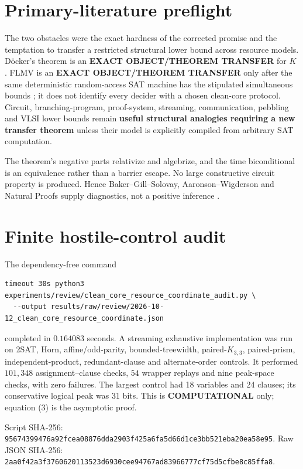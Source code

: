 \documentclass[11pt]{article}
\newcommand{\COMP}{\textbf{COMPUTATIONAL}}
\begin{document}
\section{Primary-literature preflight}

The two obstacles were the exact hardness of the corrected promise and the
temptation to transfer a restricted structural lower bound across resource
models.  D\"ocker's theorem is an \textbf{EXACT OBJECT/THEOREM TRANSFER} for
$K$ \cite{Docker19}.  FLMV is an \textbf{EXACT OBJECT/THEOREM TRANSFER} only
after the same deterministic random-access SAT machine has the stipulated
simultaneous bounds \cite{FLMV05}; it does not identify every decider with a
chosen clean-core protocol.  Circuit, branching-program, proof-system,
streaming, communication, pebbling and VLSI lower bounds remain
\textbf{useful structural analogies requiring a new transfer theorem} unless
their model is explicitly compiled from arbitrary SAT computation.

The theorem's negative parts relativize and algebrize, and the time
biconditional is an equivalence rather than a barrier escape.  No large
constructive circuit property is produced.  Hence Baker--Gill--Solovay,
Aaronson--Wigderson and Natural Proofs supply diagnostics, not a positive
inference \cite{BGS75,AW09,RR97}.

\section{Finite hostile-control audit}

The dependency-free command
\begin{verbatim}
timeout 30s python3 experiments/review/clean_core_resource_coordinate_audit.py \
  --output results/raw/review/2026-10-12_clean_core_resource_coordinate.json
\end{verbatim}
completed in $0.164083$ seconds.  A streaming exhaustive implementation was
run on 2SAT, Horn, affine/odd-parity, bounded-treewidth, paired-$K_{3,3}$,
paired-prism, independent-product, redundant-clause and alternate-order
controls.  It performed $101{,}348$ assignment--clause checks, $54$ wrapper
replays and nine peak-space checks, with zero failures.  The largest control
had 18 variables and 24 clauses; its conservative logical peak was 31 bits.
This is \COMP{} only; equation (3) is the asymptotic proof.

Script SHA-256:
\nolinkurl{95674399476a92fcea08876dda2903f425a6fa5d66d1ce3bb521eba20ea58e95}.
Raw JSON SHA-256:
\nolinkurl{2aa0f42a3f3760620113523d6930cee94767ad83966777cf75d5cfbe8c85ffa8}.
\end{document}
